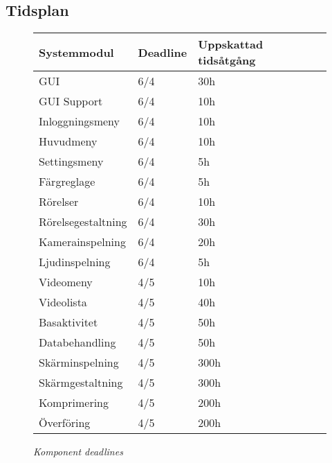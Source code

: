 \subsection{Tidsplan}
\begin{figure}[H]
\centering
\begin{tabular}{ | l | l | l |}
  \hline
  \textbf{Systemmodul} & \textbf{Deadline} & \textbf{Uppskattad tidsåtgång} \\ \hline
  GUI & 6/4 & 30h \\ \hline
  GUI Support & 6/4 & 10h \\ \hline
  Inloggningsmeny & 6/4 & 10h \\ \hline
  Huvudmeny & 6/4 & 10h \\ \hline
  Settingsmeny & 6/4 & 5h \\ \hline
  Färgreglage & 6/4 & 5h \\ \hline
  Rörelser & 6/4 & 10h \\ \hline
  Rörelsegestaltning & 6/4 & 30h \\ \hline
  Kamerainspelning & 6/4 & 20h \\ \hline
  Ljudinspelning & 6/4 & 5h \\ \hline
  Videomeny & 4/5 & 10h \\ \hline
  Videolista & 4/5 & 40h \\ \hline
  Basaktivitet & 4/5 & 50h \\ \hline
  Databehandling & 4/5 & 50h \\ \hline
  Skärminspelning & 4/5 & 300h  \\ \hline
  Skärmgestaltning & 4/5 & 300h \\ \hline
  Komprimering & 4/5 & 200h \\ \hline
  Överföring & 4/5 & 200h \\ \hline
\end{tabular}
\caption*{\textit{Komponent deadlines}}
\end{figure}
